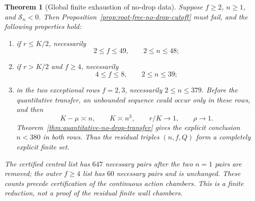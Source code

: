 \documentclass[11pt]{article}
\newtheorem{theorem}{Theorem}[section]
\theoremstyle{remark}
\begin{document}
\begin{theorem}[Global finite exhaustion of no-drop data]
\label{thm:no-drop-global-exhaustion}
Suppose $f\geq2$, $n\geq1$, and $\mathcal S_n<0$.  Then
Proposition~\ref{prop:root-free-no-drop-cutoff} must fail, and the following
properties hold:
\begin{enumerate}
\item if $r\leq K/2$, necessarily
 \begin{equation}
 2\leq f\leq49,\qquad2\leq n\leq48;
 \label{eq:no-drop-central-box}
 \end{equation}
 \item if $r>K/2$ and $f\geq4$, necessarily
 \begin{equation}
 4\leq f\leq8,\qquad2\leq n\leq39;
 \label{eq:no-drop-outer-box}
 \end{equation}
 \item in the two exceptional rows $f=2,3$, necessarily
 $2\leq n\leq379$.  Before the quantitative transfer, an unbounded
 sequence could occur only in these rows, and then
 \begin{equation}
 K-\mu\asymp n,\qquad K\asymp n^3,\qquad
 r/K\longrightarrow1,\qquad\rho\longrightarrow1.
 \label{eq:no-drop-escaping-ray}
 \end{equation}
 Theorem~\ref{thm:quantitative-no-drop-transfer} gives the explicit
 conclusion $n<380$ in both rows.  Thus the residual triples
 $(n,f,Q)$ form a completely explicit finite set.
\end{enumerate}
The certified central list has $647$ necessary pairs after the two $n=1$
pairs are removed; the outer $f\geq4$ list has $60$ necessary pairs and is
unchanged.  These counts precede certification of the continuous action
chambers.
This is a finite reduction, not a proof of the residual finite wall
chambers.
\end{theorem}
\end{document}
